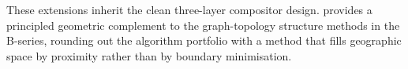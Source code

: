 These extensions inherit the clean three-layer compositor design.
\cvd{} provides a principled geometric complement to the graph-topology
structure methods in the B-series, rounding out the algorithm portfolio
with a method that fills geographic space by proximity rather than by
boundary minimisation.

